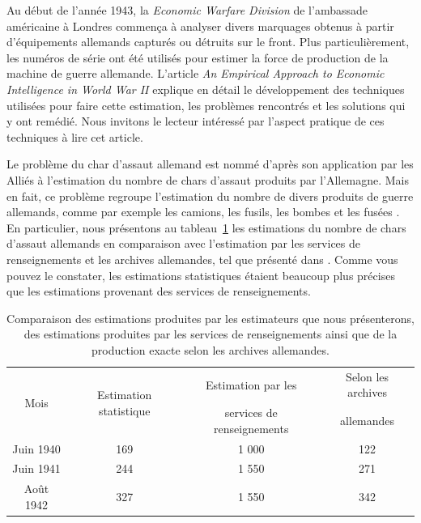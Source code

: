 \documentclass[10pt]{article}
\begin{document}
Au début de l'année 1943, la \emph{Economic Warfare Division} de
l'ambassade américaine à Londres commença à analyser divers marquages
obtenus à partir d'équipements allemands capturés ou détruits sur le
front. Plus particulièrement, les numéros de série ont été utilisés pour
estimer la force de production de la machine de guerre allemande.
L'article \emph{An Empirical Approach to Economic Intelligence in World
War II} \cite{Ruggles1947} explique en détail le développement des
techniques utilisées pour faire cette estimation, les problèmes
rencontrés et les solutions qui y ont remédié. Nous invitons le lecteur
intéressé par l'aspect pratique de ces techniques à lire cet article.

Le problème du char d'assaut allemand est nommé d'après son application
par les Alliés à l'estimation du nombre de chars d'assaut produits par
l'Allemagne. Mais en fait, ce problème regroupe l'estimation du nombre
de divers produits de guerre allemands, comme par exemple les camions,
les fusils, les bombes et les fusées \cite{Ruggles1947}. En particulier,
nous présentons au tableau~\ref{tab:estimation_ruggles} les estimations
du nombre de chars d'assaut allemands en comparaison avec l'estimation
par les services de renseignements et les archives allemandes, tel que
présenté dans \cite{Ruggles1947}. Comme vous pouvez le constater, les
estimations statistiques étaient beaucoup plus précises que les
estimations provenant des services de renseignements.

\begin{table}[ht]
\begin{center}
\begin{tabular}{cccc}
\multirow{2}{*}{Mois} & \multirow{2}{*}{Estimation statistique} & Estimation par les & Selon les archives \\
& & services de renseignements &  allemandes \\
\hline
\hline
Juin 1940 & 169 & 1 000 & 122 \\
Juin 1941 & 244 & 1 550 & 271 \\
Août 1942 & 327 & 1 550 & 342 \\
\hline
\end{tabular}
\end{center}
\caption{\label{tab:estimation_ruggles} {Comparaison des estimations produites par les estimateurs que nous présenterons, des estimations produites par les services de renseignements ainsi que de la production exacte selon les archives allemandes.} }
\end{table}
\end{document}
